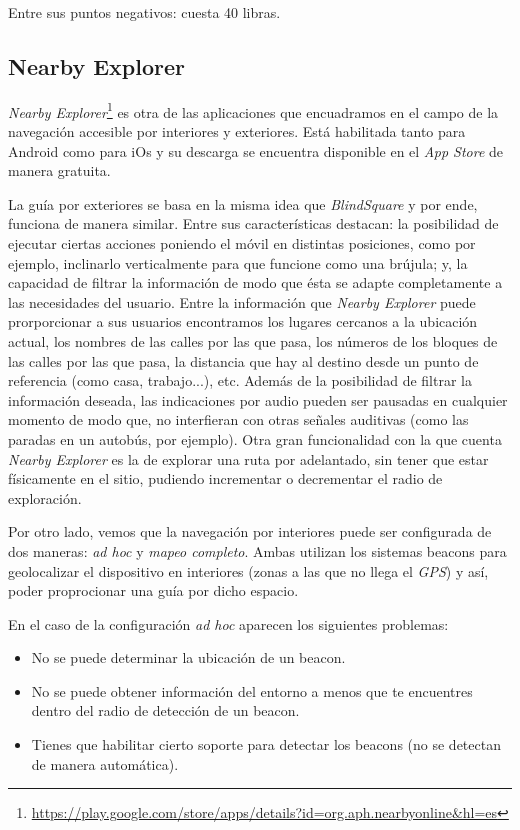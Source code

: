 \documentclass{article}
\begin{document}
	    Entre sus puntos negativos: cuesta 40 libras.
	
	\subsection{Nearby Explorer}
	    \textit{Nearby Explorer}\footnote{\url{https://play.google.com/store/apps/details?id=org.aph.nearbyonline&hl=es}} es otra de las aplicaciones que encuadramos en el campo de la navegación accesible por interiores y exteriores. Está habilitada tanto para Android como para iOs y su descarga se encuentra disponible en el \textit{App Store} de manera gratuita. 
	
	    La guía por exteriores se basa en la misma idea que \textit{BlindSquare} y por ende, funciona de manera similar. Entre sus características destacan: la posibilidad de ejecutar ciertas acciones poniendo el móvil en distintas posiciones, como por ejemplo, inclinarlo verticalmente para que funcione como una brújula; y, la capacidad de filtrar la información de modo que ésta se adapte completamente a las necesidades del usuario. Entre la información que \textit{Nearby Explorer} puede prorporcionar a sus usuarios encontramos los lugares cercanos a la ubicación actual, los nombres de las calles por las que pasa, los números de los bloques de las calles por las que pasa, la distancia que hay al destino desde un punto de referencia (como casa, trabajo...), etc. Además de la posibilidad de filtrar la información deseada, las indicaciones por audio pueden ser pausadas en cualquier momento de modo que, no interfieran con otras señales auditivas (como las paradas en un autobús, por ejemplo). Otra gran funcionalidad con la que cuenta \textit{Nearby Explorer} es la de explorar una ruta por adelantado, sin tener que estar físicamente en el sitio, pudiendo incrementar o decrementar el radio de exploración.
	
    	Por otro lado, vemos que la navegación por interiores puede ser configurada de dos maneras: \textit{ad hoc} y \textit{mapeo completo}. Ambas utilizan los sistemas beacons para geolocalizar el dispositivo en interiores (zonas a las que no llega el \textit{GPS}) y así, poder proprocionar una guía por dicho espacio.
	
	    En el caso de la configuración \textit{ad hoc} aparecen los siguientes problemas:
	    \begin{itemize}
		    \item No se puede determinar la ubicación de un beacon.
		    \item No se puede obtener información del entorno a menos que te encuentres dentro del radio de detección de un beacon.
		    \item Tienes que habilitar cierto soporte para detectar los beacons (no se detectan de manera automática).
	    \end{itemize}
\end{document}
